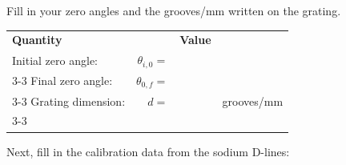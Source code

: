 \documentclass[addpoints]{physlabs}
\begin{document}
\begin{postlab}


    \question[3] Fill in your zero angles and the grooves/mm written on the grating.

    \begin{center}
        \renewcommand{\arraystretch}{1.5}
        \captionsetup{font=normalsize}
        \begin{tabular}{lrp{2cm}l}
        \hline
        \textbf{Quantity} & & \textbf{Value} &
        \\
        Initial zero angle: & $\theta_{i,0}=$ & &
        \\
        \cline{3-3}
        Final zero angle:   & $\theta_{0,f}=$ & &
        \\
        \cline{3-3}
        Grating dimension:  & $d=$ & & grooves/mm
        \\
        \cline{3-3}
        \end{tabular}
    \end{center}

    Next, fill in the calibration data from the sodium D-lines:


\end{postlab}
\end{document}
